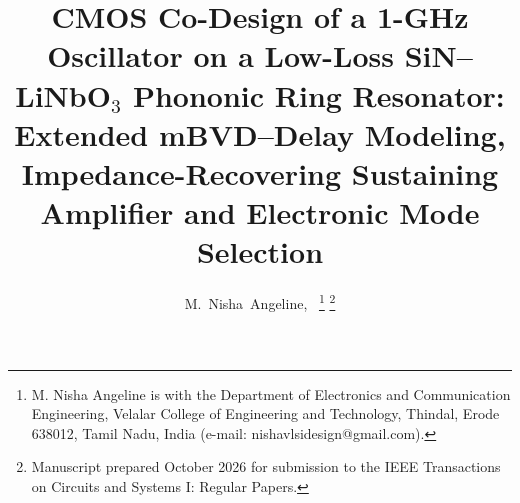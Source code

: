 \documentclass[journal]{IEEEtran}
\begin{document}
\title{CMOS Co-Design of a 1-GHz Oscillator on a Low-Loss SiN--LiNbO$_3$ Phononic Ring Resonator: Extended mBVD--Delay Modeling, Impedance-Recovering Sustaining Amplifier and Electronic Mode Selection}

\author{M.~Nisha~Angeline,~
\thanks{M. Nisha Angeline is with the Department of Electronics and Communication Engineering, Velalar College of Engineering and Technology, Thindal, Erode 638012, Tamil Nadu, India (e-mail: nishavlsidesign@gmail.com).}
\thanks{Manuscript prepared October 2026 for submission to the IEEE Transactions on Circuits and Systems I: Regular Papers.}}


\maketitle
\end{document}
